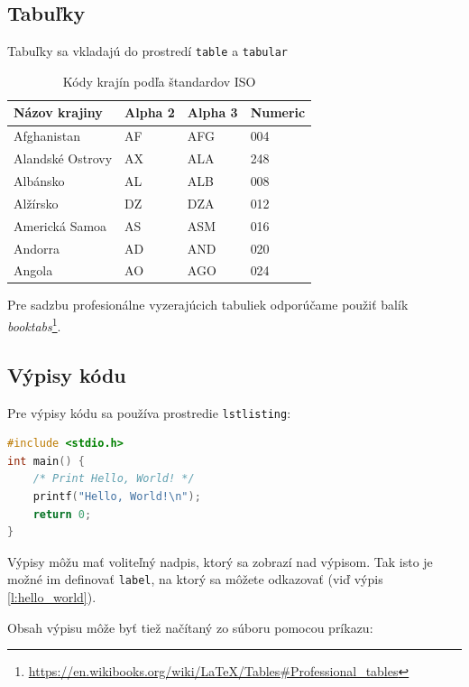 \subsection*{Tabuľky}

Tabuľky sa vkladajú do prostredí \texttt{table} a \texttt{tabular}

\begin{table}[!ht]
	\caption{Kódy krajín podľa štandardov ISO}\label{t:1}
	\smallskip
	\centering

	\begin{tabular}{llll}
		\toprule
		Názov krajiny & Alpha 2 & Alpha 3 & Numeric\\
		\midrule
		Afghanistan & AF & AFG & 004\\
		Alandské Ostrovy & AX & ALA & 248\\
		Albánsko & AL & ALB & 008\\
		Alžírsko & DZ & DZA & 012\\
		Americká Samoa & AS & ASM & 016\\
		Andorra & AD & AND & 020\\
		Angola & AO & AGO & 024\\
		\toprule
	\end{tabular}
\end{table}

Pre sadzbu profesionálne vyzerajúcich tabuliek odporúčame použiť balík \emph{booktabs}\footnote{\url{https://en.wikibooks.org/wiki/LaTeX/Tables\#Professional_tables}}.

\subsection*{Výpisy kódu}

Pre výpisy kódu sa používa prostredie \texttt{lstlisting}:

\begin{lstlisting}[language=C,caption={Program, ktorý pozdraví celý svet}, label={l:hello_world}]
#include <stdio.h>
int main() {
    /* Print Hello, World! */
    printf("Hello, World!\n");
    return 0;
}
\end{lstlisting}

Výpisy môžu mať voliteľný nadpis, ktorý sa zobrazí nad výpisom. Tak isto je možné im definovať \texttt{label}, na ktorý sa môžete odkazovať (viď výpis \ref{l:hello_world}).

Obsah výpisu môže byť tiež načítaný zo súboru pomocou príkazu:



